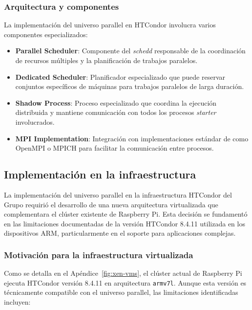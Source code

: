 \subsubsection{Arquitectura y componentes}
\noindent

La implementación del universo parallel en HTCondor involucra varios componentes especializados:

\begin{itemize}
	\item \textbf{Parallel Scheduler}: Componente del \textit{schedd} responsable de la coordinación de recursos múltiples y la planificación de trabajos paralelos.

	\item \textbf{Dedicated Scheduler}: Planificador especializado que puede reservar conjuntos específicos de máquinas para trabajos paralelos de larga duración.

	\item \textbf{Shadow Process}: Proceso especializado que coordina la ejecución distribuida y mantiene comunicación con todos los procesos \textit{starter} involucrados.

	\item \textbf{MPI Implementation}: Integración con implementaciones estándar de \MPI como OpenMPI o MPICH para facilitar la comunicación entre procesos.
\end{itemize}

\subsection{Implementación en la infraestructura \GRID}
\noindent

La implementación del universo parallel en la infraestructura HTCondor del Grupo \GRID requirió el desarrollo de una nueva arquitectura virtualizada que complementara el clúster existente de Raspberry Pi. Esta decisión se fundamentó en las limitaciones documentadas de la versión HTCondor 8.4.11 utilizada en los dispositivos ARM, particularmente en el soporte para aplicaciones \MPI complejas.

\subsubsection{Motivación para la infraestructura virtualizada}
\noindent

Como se detalla en el Apéndice~\ref{fig:xen-vms}, el clúster actual de Raspberry Pi ejecuta HTCondor versión 8.4.11 en arquitectura \texttt{armv7l}. Aunque esta versión es técnicamente compatible con el universo parallel, las limitaciones identificadas incluyen:

